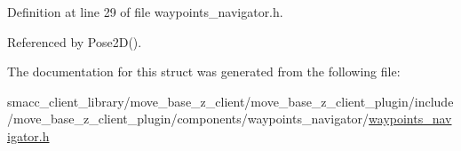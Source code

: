 Definition at line 29 of file waypoints\+\_\+navigator.\+h.



Referenced by Pose2\+D().



The documentation for this struct was generated from the following file\+:\begin{DoxyCompactItemize}
\item 
smacc\+\_\+client\+\_\+library/move\+\_\+base\+\_\+z\+\_\+client/move\+\_\+base\+\_\+z\+\_\+client\+\_\+plugin/include/move\+\_\+base\+\_\+z\+\_\+client\+\_\+plugin/components/waypoints\+\_\+navigator/\hyperlink{waypoints__navigator_8h}{waypoints\+\_\+navigator.\+h}\end{DoxyCompactItemize}
